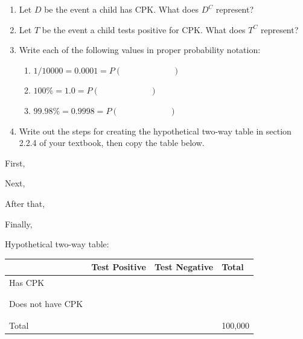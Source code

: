 \documentclass[
]{report}
\providecommand{\tightlist}{%
  \setlength{\itemsep}{0pt}\setlength{\parskip}{0pt}}
\newcommand{\rgs}{\vspace{12pt}} %
\newcommand{\rgi}{\hspace{24pt}}  %
\begin{document}
\begin{enumerate}
\def\labelenumi{\arabic{enumi}.}
\item
  Let \(D\) be the event a child has CPK. What does \(D^C\) represent?
  \rgs
\item
  Let \(T\) be the event a child tests positive for CPK. What does \(T^C\) represent?
  \rgs
\item
  Write each of the following values in proper probability notation:

  \begin{enumerate}
  \def\labelenumii{\alph{enumii}.}
  \tightlist
  \item
    \(1/10000 = 0.0001 = P( \hspace{1in} )\)\\
  \item
    \(100\% = 1.0 = P( \hspace{1in} )\)\\
  \item
    \(99.98\% = 0.9998 = P( \hspace{1in} )\)
  \end{enumerate}
\item
  Write out the steps for creating the hypothetical two-way table in section 2.2.4 of your textbook, then copy the table below.
\end{enumerate}

\rgi First,
\rgs

\rgi Next,
\rgs

\rgi After that,
\rgs

\rgi Finally,
\rgs

\newpage

\rgi Hypothetical two-way table:

\begin{center}
\begin{tabular}{|l|p{1.3in}|p{1.3in}|p{1.3in}|}
\hline
&   Test Positive   & Test Negative & Total \\ \hline
Has CPK     & & & \\
    & & & \\
    & & & \\ \hline
Does not have CPK       & & & \\
    & & & \\
    & & & \\ \hline     
Total & & & 100,000 \\ \hline
\end{tabular}
\end{center}
\rgs
\end{document}
